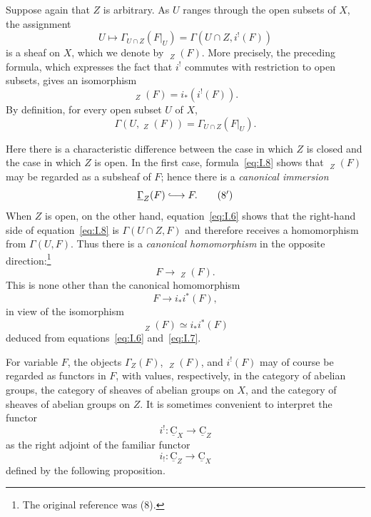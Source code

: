 \documentclass[11pt]{article}
\newcommand{\uGamma}{\mathop{\underline{\Gamma}}\nolimits}
\newcommand{\uC}{\underline{\mathrm{C}}}
\newcommand{\restr}[2]{#1\vert_{#2}}
\newcommand{\srcpage}[1]{%
  \marginpar{\raggedright\scriptsize\color{rulegray}French printed p.~#1}}
\begin{document}
Suppose again that $Z$ is arbitrary.  As $U$ ranges through the open
subsets of $X$, the assignment
\[
  U\longmapsto \Gamma_{U\cap Z}(\restr{F}{U})
  =\Gamma(U\cap Z,i^!(F))
\]
is a sheaf on $X$, which we denote by $\uGamma_Z(F)$.  More precisely,
the preceding formula, which expresses the fact that $i^!$ commutes with
restriction to open subsets, gives an isomorphism
\begin{equation}
  \uGamma_Z(F)=i_*(i^!(F)).
  \tag{7}\label{eq:I.7}
\end{equation}
By definition,\srcpage{8} for every open subset $U$ of $X$,
\begin{equation}
  \Gamma(U,\uGamma_Z(F))
  =\Gamma_{U\cap Z}(\restr{F}{U}).
  \tag{8}\label{eq:I.8}
\end{equation}

Here there is a characteristic difference between the case in which
$Z$ is closed and the case in which $Z$ is open.  In the first case,
formula~\eqref{eq:I.8} shows that $\uGamma_Z(F)$ may be regarded as a
subsheaf of $F$; hence there is a \emph{canonical immersion}
\begin{equation}
  \uGamma_Z(F)\lhook\joinrel\longrightarrow F.
  \tag{$8'$}\label{eq:I.8prime}
\end{equation}
When $Z$ is open, on the other hand, equation~\eqref{eq:I.6} shows that
the right-hand side of equation~\eqref{eq:I.8} is
$\Gamma(U\cap Z,F)$ and therefore receives a homomorphism from
$\Gamma(U,F)$.  Thus there is a \emph{canonical homomorphism} in the
opposite direction:\footnote{The original reference was (8).}
\begin{equation}
  F\longrightarrow\uGamma_Z(F).
  \tag{$8''$}\label{eq:I.8doubleprime}
\end{equation}
This is none other than the canonical homomorphism
\[
  F\longrightarrow i_*i^*(F),
\]
in view of the isomorphism
\begin{equation}
  \uGamma_Z(F)\simeq i_*i^*(F)
  \tag{6 bis}\label{eq:I.6bis}
\end{equation}
deduced from equations~\eqref{eq:I.6} and~\eqref{eq:I.7}.

For variable $F$, the objects $\Gamma_Z(F)$, $\uGamma_Z(F)$, and
$i^!(F)$ may of course be regarded as functors in $F$, with values,
respectively, in the category of abelian groups, the category of sheaves
of abelian groups on $X$, and the category of sheaves of abelian groups
on $Z$.  It is sometimes convenient to interpret the functor
\[
  i^!: \uC_X\longrightarrow\uC_Z
\]
as the right adjoint of the familiar functor
\[
  i_!: \uC_Z\longrightarrow\uC_X
\]
defined by the following proposition.
\end{document}
